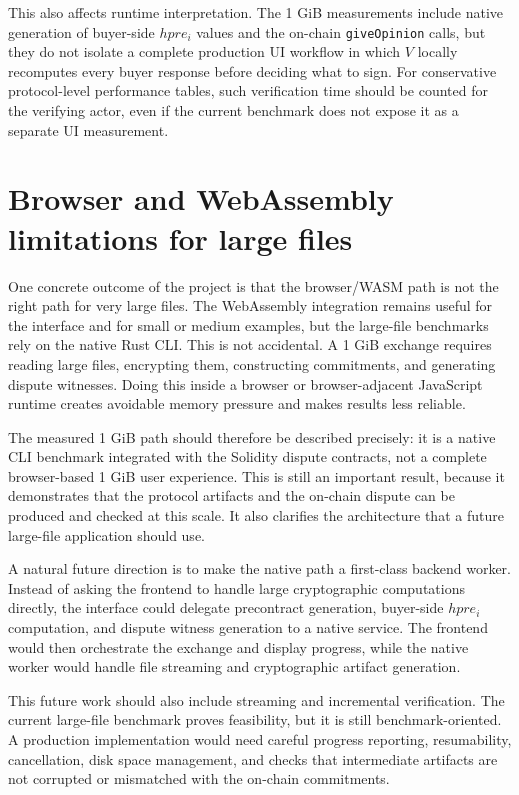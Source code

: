 This also affects runtime interpretation. The 1 GiB measurements include native generation
of buyer-side \(hpre_i\) values and the on-chain \texttt{giveOpinion} calls, but they do
not isolate a complete production UI workflow in which \(V\) locally recomputes every
buyer response before deciding what to sign. For conservative protocol-level performance
tables, such verification time should be counted for the verifying actor, even if the
current benchmark does not expose it as a separate UI measurement.

\section[Browser and WASM limits]{Browser and WebAssembly limitations for large files}

One concrete outcome of the project is that the browser/WASM path is not the right path for
very large files. The WebAssembly integration remains useful for the interface and for
small or medium examples, but the large-file benchmarks rely on the native Rust CLI. This
is not accidental. A 1 GiB exchange requires reading large files, encrypting them,
constructing commitments, and generating dispute witnesses. Doing this inside a browser or
browser-adjacent JavaScript runtime creates avoidable memory pressure and makes results
less reliable.

The measured 1 GiB path should therefore be described precisely: it is a native CLI
benchmark integrated with the Solidity dispute contracts, not a complete browser-based
1 GiB user experience. This is still an important result, because it demonstrates that the
protocol artifacts and the on-chain dispute can be produced and checked at this scale. It
also clarifies the architecture that a future large-file application should use.

A natural future direction is to make the native path a first-class backend worker. Instead
of asking the frontend to handle large cryptographic computations directly, the interface
could delegate precontract generation, buyer-side \(hpre_i\) computation, and dispute
witness generation to a native service. The frontend would then orchestrate the exchange
and display progress, while the native worker would handle file streaming and cryptographic
artifact generation.

This future work should also include streaming and incremental verification. The current
large-file benchmark proves feasibility, but it is still benchmark-oriented. A production
implementation would need careful progress reporting, resumability, cancellation, disk
space management, and checks that intermediate artifacts are not corrupted or mismatched
with the on-chain commitments.

